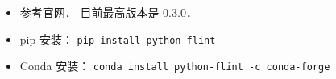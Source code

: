 
\begin{issues}
\issueDraft
\end{issues}

\begin{itemize}
\item 参考\href{https://fredrikj.net/python-flint/}{官网}． 目前最高版本是 0.3.0．
\item pip 安装： \verb|pip install python-flint|
\item Conda 安装： \verb|conda install python-flint -c conda-forge|
\end{itemize}

